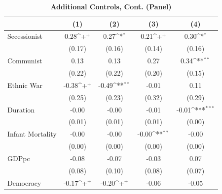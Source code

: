 \documentclass[12pt, letterpaper]{article}
\begin{document}
\newpage
\begin{table}[htbp]\centering
\begin{small}
\def\sym#1{\ifmmode^{#1}\else\(^{#1}\)\fi}
\setcounter{table}{17}
\renewcommand\thetable{A.\Roman{table}}
\makeatletter
\def\myrow{}
\CT@everycr{\noalign{%
\global\let\CT@row@color\relax
\stepcounter{mym16}%
\ifnum\value{mym16}=2
  \gdef\myrow{\rowcolor{gray!50}}
\else\ifnum\value{mym16}=4
  \gdef\myrow{}
\fi\fi
}\myrow}
\caption{\textbf{Additional Controls, Cont. (Panel)}}
\begin{tabular}{l*{4}{c}}
\hline\hline
                    &\multicolumn{1}{c}{(1)}&\multicolumn{1}{c}{(2)}&\multicolumn{1}{c}{(3)}&\multicolumn{1}{c}{(4)}\\
\hline
Secessionist     &        0.28\sym{+}  &        0.27\sym{*}  &        0.21\sym{+}  &        0.30\sym{*}  \\
                    &      (0.17)         &      (0.16)         &      (0.14)         &      (0.16)         \\
Communist           &        0.13         &        0.13         &        0.27         &        0.34\sym{**} \\
                    &      (0.22)         &      (0.22)         &      (0.20)         &      (0.15)         \\
Ethnic War          &       -0.38\sym{+}  &       -0.49\sym{**} &       -0.01         &        0.11         \\
                    &      (0.25)         &      (0.23)         &      (0.32)         &      (0.29)         \\
Duration            &       -0.00         &       -0.00         &       -0.01         &       -0.01\sym{***}\\
                    &      (0.01)         &      (0.01)         &      (0.01)         &      (0.00)         \\
Infant Mortality    &       -0.00         &       -0.00         &       -0.00\sym{**} &       -0.00         \\
                    &      (0.00)         &      (0.00)         &      (0.00)         &      (0.00)         \\
GDPpc               &       -0.08         &       -0.07         &       -0.03         &        0.07         \\
                    &      (0.08)         &      (0.10)         &      (0.08)         &      (0.07)         \\
Democracy           &       -0.17\sym{+}  &       -0.20\sym{+}  &       -0.06         &       -0.05         \\

\end{tabular}
\end{small}
\end{table}
\end{document}
